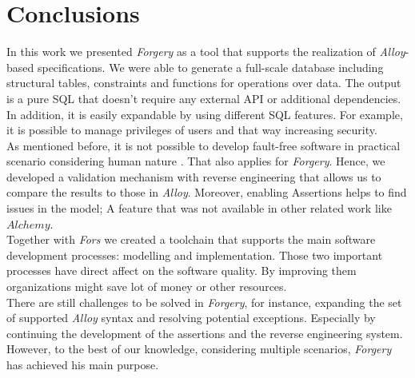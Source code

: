 \documentclass[oneside]{book}
\begin{document}
\newpage

\chapter{Conclusions}

In this work we presented \textit{Forgery} as a tool that supports the realization of \textit{Alloy}-based specifications. We were able to generate a full-scale database including structural tables, constraints and functions for operations over data. The output is a pure SQL that doesn't require any external API or additional dependencies. In addition, it is easily expandable by using different SQL features. For example, it is possible to manage privileges of users and that way increasing security.\\ 

As mentioned before, it is not possible to develop fault-free software in practical scenario considering human nature \cite{reliability}. That also applies for \textit{Forgery}. Hence, we developed a validation mechanism with reverse engineering that allows us to compare the results to those in \textit{Alloy}. Moreover, enabling Assertions helps to find issues in the model; A feature that was not available in other related work like $Alchemy$.\\

Together with \textit{Fors} we created a toolchain that supports the main software development processes: modelling and implementation. Those two important processes have direct affect on the software quality. By improving them organizations might save lot of money or other resources.\\

There are still challenges to be solved in \textit{Forgery}, for instance, expanding the set of supported \textit{Alloy} syntax and resolving potential exceptions. Especially by continuing the development of the assertions and the reverse engineering system. However, to the best of our knowledge, considering multiple scenarios, \textit{Forgery} has achieved his main purpose. 
\end{document}
